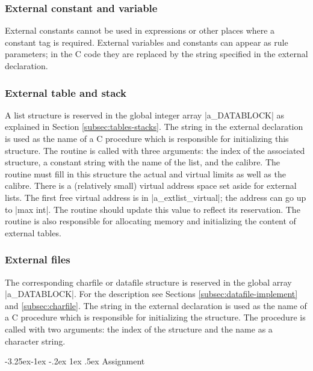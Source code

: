 \documentclass[titlepage]{article}
\makeatletter
\newcommand\g[1]{\textsf{\color{blue!90!black}#1}}
\renewcommand\subsection{%
\@startsection{subsection}{2}{\z@}%
   {-3.25ex\@plus -1ex \@minus -.2ex}%
   {1ex \@plus .5ex}%
   {\normalfont\normalsize\bfseries}}
\makeatother
\begin{document}
\subsubsection{External constant and variable}

External constants cannot be used in expressions or other places where a
constant tag is required. External variables and constants can appear as
rule parameters; in the {\sf C} code they are replaced by the string
specified in the \g{external declaration}.

\subsubsection{External table and stack}

A list structure is reserved in the global integer array \pp|a\_DATABLOCK|
as explained in Section \ref{subsec:tables-stacks}. The string in the
external declaration is used as the name of a {\sf C} procedure which is
responsible for initializing this structure. The routine is called with
three arguments: the index of the associated structure, a constant string
with the name of the list, and the calibre. The routine must fill in this
structure the actual and virtual limits as well as the calibre. There is a
(relatively small) virtual address space set aside for external lists. The
first free virtual address is in \pp|a\_extlist\_virtual|; the address can
go up to \pp|max int|. The routine should update this value to reflect its
reservation. The routine is also responsible for allocating memory and
initializing the content of external tables.

\subsubsection{External files}

The corresponding charfile or datafile structure is reserved in the global
array \pp|a\_DATABLOCK|. For the description see Sections
\ref{subsec:datafile-implement} and \ref{subsec:charfile}. The string in the
external declaration is used as the name of a {\sf C} procedure which is
responsible for
initializing the structure. The procedure is called with two arguments:
the index of the structure and the name as a character string.

\subsection{Assignment}\label{subsec:assignment}
\end{document}
